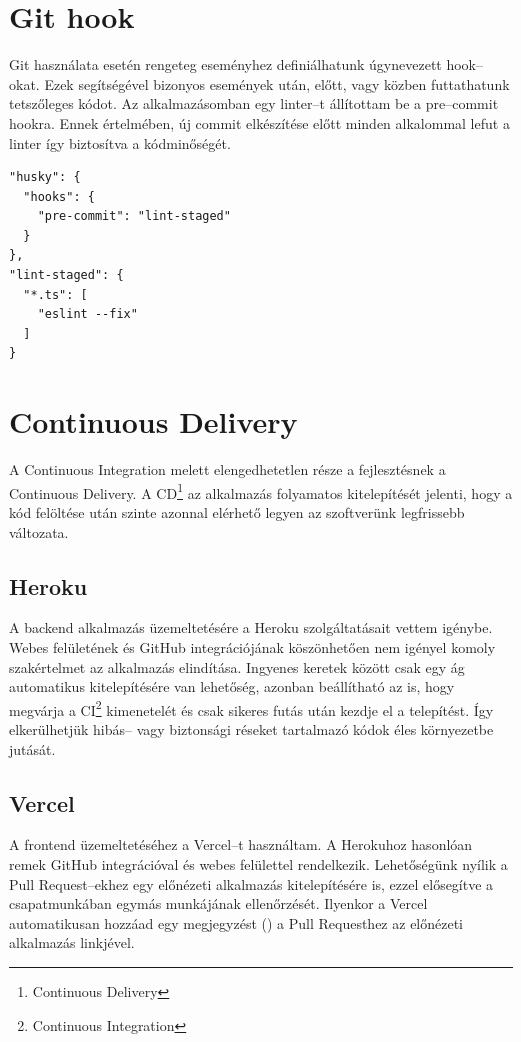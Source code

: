 \section{Git hook}
Git használata esetén rengeteg eseményhez definiálhatunk úgynevezett hook–okat.
Ezek segítségével bizonyos események után, előtt, vagy közben futtathatunk tetszőleges kódot.
Az alkalmazásomban egy linter–t állítottam be a pre–commit hookra.
Ennek értelmében, új commit elkészítése előtt minden alkalommal lefut a linter így biztosítva a kódminőségét.

\begin{lstlisting}[style=ES6, caption=Pre–commit hook beállításai]    
"husky": {
  "hooks": {
    "pre-commit": "lint-staged"
  }
},
"lint-staged": {
  "*.ts": [
    "eslint --fix"
  ]
}
\end{lstlisting}
  

\section{Continuous Delivery}
A Continuous Integration melett elengedhetetlen része a fejlesztésnek a Continuous Delivery.
A CD\footnote{Continuous Delivery} az alkalmazás folyamatos kitelepítését jelenti, hogy a kód felöltése után szinte azonnal elérhető legyen az szoftverünk legfrissebb változata.


\subsection{Heroku}
A backend alkalmazás üzemeltetésére a Heroku szolgáltatásait vettem igénybe.
Webes felületének és GitHub integrációjának köszönhetően nem igényel komoly szakértelmet az alkalmazás elindítása.
Ingyenes keretek között csak egy ág automatikus kitelepítésére van lehetőség, azonban beállítható az is, hogy megvárja a CI\footnote{Continuous Integration} kimenetelét és csak sikeres futás után kezdje el a telepítést.
Így elkerülhetjük hibás– vagy biztonsági réseket tartalmazó kódok éles környezetbe jutását.


\subsection{Vercel}
A frontend üzemeltetéséhez a Vercel–t használtam. 
A Herokuhoz hasonlóan remek GitHub integrációval és webes felülettel rendelkezik. 
Lehetőségünk nyílik a Pull Request–ekhez egy előnézeti alkalmazás kitelepítésére is, ezzel elősegítve a csapatmunkában egymás munkájának ellenőrzését.
Ilyenkor a Vercel automatikusan hozzáad egy megjegyzést () a Pull Requesthez az előnézeti alkalmazás linkjével.


